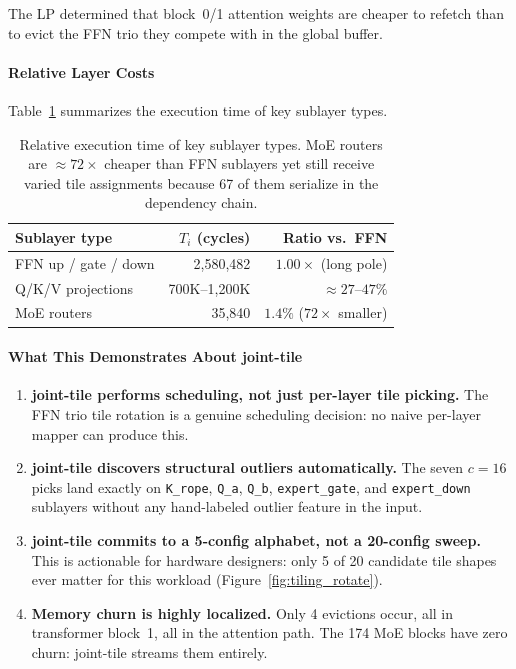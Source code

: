 \noindent The LP determined that block~0/1 attention weights are cheaper to refetch than to evict the FFN trio they compete with in the global buffer.

\paragraph{Relative Layer Costs}
Table~\ref{tab:ds_layer_costs} summarizes the execution time of key sublayer types.
\begin{table}[h]
\centering
\caption{Relative execution time of key sublayer types. MoE routers
are ${\approx}72\times$ cheaper than FFN sublayers yet still receive varied tile assignments because 67 of them serialize in the dependency chain.}
\label{tab:ds_layer_costs}
\begin{tabular}{lrr}
\toprule
\textbf{Sublayer type} & \textbf{$T_i$ (cycles)} &
\textbf{Ratio vs.\ FFN} \\
\midrule
FFN up / gate / down & 2{,}580{,}482 & $1.00\times$ (long pole) \\
Q/K/V projections    & 700K–1{,}200K & ${\approx}27$–$47\%$ \\
MoE routers          & 35{,}840      & $1.4\%$ ($72\times$ smaller) \\
\bottomrule
\end{tabular}
\end{table}

\paragraph{What This Demonstrates About joint-tile}

\begin{enumerate}

    \item \textbf{joint-tile performs scheduling, not just per-layer tile
          picking.} The FFN trio tile rotation is a genuine scheduling decision: no naive per-layer mapper can produce this.

    \item \textbf{joint-tile discovers structural outliers automatically.}
          The seven $c=16$ picks land exactly on \texttt{K\_rope}, \texttt{Q\_a}, \texttt{Q\_b}, \texttt{expert\_gate}, and \texttt{expert\_down} sublayers without any hand-labeled outlier feature in the input.

    \item \textbf{joint-tile commits to a 5-config alphabet, not a 20-config
          sweep.} This is actionable for hardware designers: only 5 of 20 candidate tile shapes ever matter for this workload (Figure~\ref{fig:tiling_rotate}).

    \item \textbf{Memory churn is highly localized.} Only 4 evictions
          occur, all in transformer block~1, all in the attention path.
The 174 MoE blocks have zero churn: joint-tile streams them entirely.

\end{enumerate}

